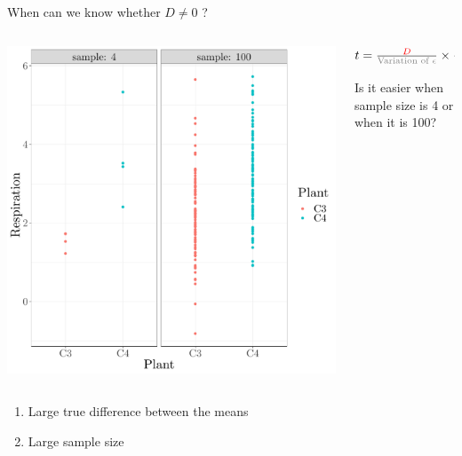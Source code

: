 \documentclass{beamer}
\begin{document}
\begin{frame}{When can we know whether $D \neq 0$ ?}

 \begin{columns}
 \begin{column}{0.5\textwidth}
 \includegraphics[width=\textwidth]{Figures/figure/ttestsample-1}
 \end{column}
 \begin{column}{0.5\textwidth}
  $ t = \frac{\color{red}{D}}{\text{\color{gray}{Variation of }}\color{gray}{\epsilon}} \times \frac{\text{Sample Size}}{\sqrt{2}}$

  \vspace{1cm}
  Is it easier when sample size is 4 or when it is 100?
 \end{column}
 \end{columns}
 
 \pause
 \begin{alertblock}{}
  \begin{enumerate}
   \item Large true difference between the means
   \item Large sample size
  \end{enumerate}
 \end{alertblock}

\end{frame}
\end{document}
